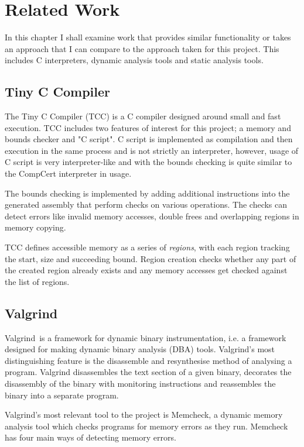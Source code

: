 \chapter{Related Work}\label{related}

In this chapter I shall examine work that provides similar functionality or takes an approach that I can compare to the approach taken for this project. This includes C interpreters, dynamic analysis tools and static analysis tools.

\section{Tiny C Compiler}
The Tiny C Compiler (TCC) is a C compiler designed around small and fast execution. TCC includes two features of interest for this project; a memory and bounds checker and "C script". C script is implemented as compilation and then execution in the same process and is not strictly an interpreter, however, usage of C script is very interpreter-like and with the bounds checking is quite similar to the CompCert interpreter in usage.

The bounds checking is implemented by adding additional instructions into the generated assembly that perform checks on various operations. The checks can detect errors like invalid memory accesses, double frees and overlapping regions in memory copying.

TCC defines accessible memory as a series of \textit{regions}, with each region tracking the start, size and succeeding bound. Region creation checks whether any part of the created region already exists and any memory accesses get checked against the list of regions.



\section{Valgrind}
Valgrind\ is a framework for dynamic binary instrumentation, i.e. a framework designed for making dynamic binary analysis (DBA) tools.  Valgrind's most distinguishing feature is the disassemble and resynthesise method of analysing a program. Valgrind disassembles the text section of a given binary, decorates the disassembly of the binary with monitoring instructions and reassembles the binary into a separate program.

Valgrind's most relevant tool to the project is Memcheck, a dynamic memory analysis tool which checks programs for memory errors as they run. Memcheck has four main ways of detecting memory errors.

